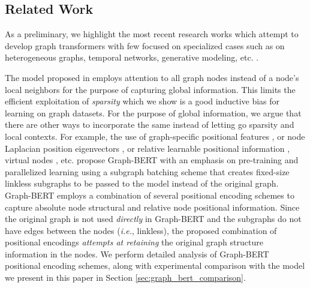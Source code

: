\documentclass[letterpaper]{article} %
\newcommand{\vijay}[1]{{\color{blue}{#1}}}
\begin{document}

\subsection{Related Work}
\label{sec:related_work}

As a preliminary, we highlight
the most recent research works 
which attempt
to develop graph transformers \cite{li2019graph, Nguyen2019U2GNN, zhang2020graph} with few focused on specialized cases such as on heterogeneous graphs, temporal networks, generative modeling, etc. \cite{yun2019graph, xu2019multi, hu2020heterogeneous, zhou2020data}. 

The model proposed in \citet{li2019graph} employs attention to all graph nodes instead of a node's local neighbors for the purpose of capturing global information. This limits the efficient exploitation of \textit{sparsity} which we show is a good inductive bias for learning on graph datasets. For the purpose of global information, we argue that there are other ways to incorporate the same instead of letting go sparsity and local contexts. For example, the use of graph-specific positional features \cite{zhang2020graph}, or node Laplacian position eigenvectors \cite{belkin2003laplacian, dwivedi2020benchmarking}, or relative learnable positional information \cite{you2019position}, virtual nodes \cite{li2015gated}, etc. 
\citet{zhang2020graph} propose Graph-BERT with an emphasis on pre-training and parallelized learning using a subgraph batching scheme that creates fixed-size linkless subgraphs to be passed to the model instead of the original graph. Graph-BERT employs a combination of several positional encoding schemes to capture absolute node structural and relative node positional information.
Since the original graph is not used \textit{directly} in Graph-BERT and the subgraphs do not have edges between the nodes (\textit{i.e.}, linkless), 
the proposed combination of positional encodings \textit{attempts at retaining} the original graph structure information in the nodes. 
We perform detailed analysis of Graph-BERT positional encoding schemes, along with experimental comparison with the model we present in this paper in Section \ref{sec:graph_bert_comparison}.
\end{document}
